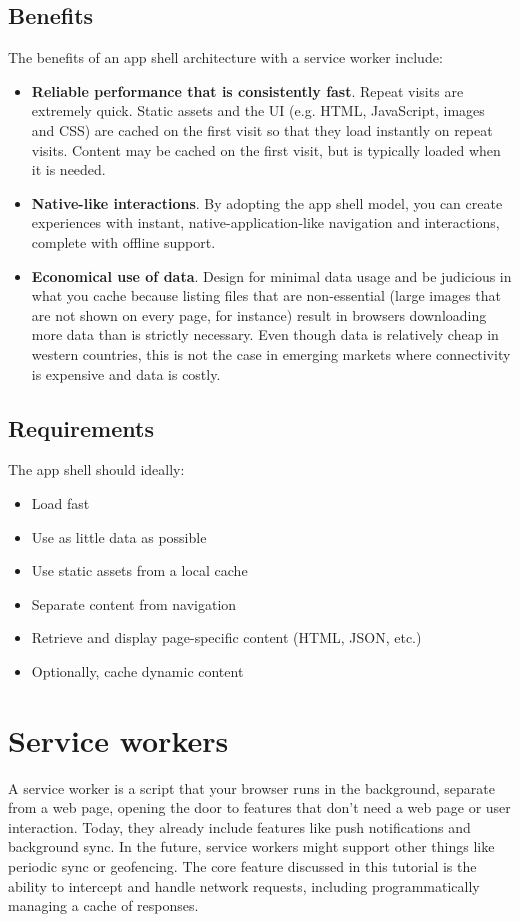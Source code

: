 \documentclass[14pt,a4paper,final]{extreport}
\begin{document}
\subsection{Benefits}
\item

The benefits of an app shell architecture with a service worker include:
\begin{itemize}
    \item \textbf{Reliable performance that is consistently fast}. Repeat visits are extremely quick. Static assets and the UI (e.g. HTML, JavaScript, images and CSS) are cached on the first visit so that they load instantly on repeat visits. Content may be cached on the first visit, but is typically loaded when it is needed.
    \item \textbf{Native-like interactions}. By adopting the app shell model, you can create experiences with instant, native-application-like navigation and interactions, complete with offline support.
    \item \textbf{Economical use of data}. Design for minimal data usage and be judicious in what you cache because listing files that are non-essential (large images that are not shown on every page, for instance) result in browsers downloading more data than is strictly necessary. Even though data is relatively cheap in western countries, this is not the case in emerging markets where connectivity is expensive and data is costly.
\end{itemize}


\subsection{Requirements}
\item The app shell should ideally:
\begin{itemize}
    \item Load fast
    \item Use as little data as possible
    \item Use static assets from a local cache
    \item Separate content from navigation
    \item Retrieve and display page-specific content (HTML, JSON, etc.)
    \item Optionally, cache dynamic content
\end{itemize}

\section{Service workers}
\item A service worker is a script that your browser runs in the background, separate from a web page, opening the door to features that don't need a web page or user interaction. Today, they already include features like push notifications and background sync. In the future, service workers might support other things like periodic sync or geofencing. The core feature discussed in this tutorial is the ability to intercept and handle network requests, including programmatically managing a cache of responses.
\end{document}
